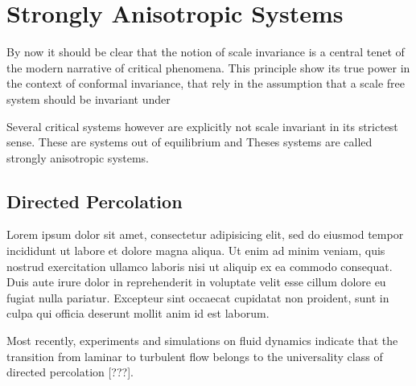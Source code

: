 \chapter{Strongly Anisotropic Systems}
\label{ch5-anis}

By now it should be clear that the notion of scale invariance is a central
tenet of the modern narrative of critical phenomena. This principle show
its true power in the context of conformal invariance, that rely in the
assumption that a scale free system should be invariant under 

Several critical systems however are explicitly not scale invariant in its
strictest sense. These are systems out of equilibrium and 
Theses systems are called strongly anisotropic systems.


\section{Directed Percolation}
\label{sec:dp}

Lorem ipsum dolor sit amet, consectetur adipisicing elit, sed do eiusmod tempor
incididunt ut labore et dolore magna aliqua. Ut enim ad minim veniam, quis
nostrud exercitation ullamco laboris nisi ut aliquip ex ea commodo consequat.
Duis aute irure dolor in reprehenderit in voluptate velit esse cillum dolore eu
fugiat nulla pariatur. Excepteur sint occaecat cupidatat non proident, sunt in
culpa qui officia deserunt mollit anim id est laborum.

Most recently, experiments and simulations on fluid dynamics indicate
that the transition from laminar to turbulent flow belongs to the
universality class of directed percolation [???].

